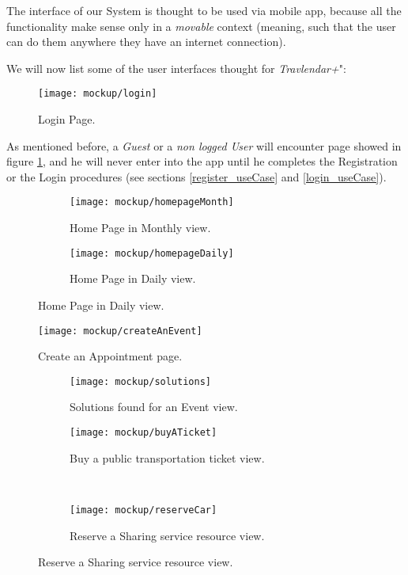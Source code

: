 The interface of our System is thought to be used via mobile app, because all the functionality make sense only in a \textit{movable} context (meaning, such that the user can do them anywhere they have an internet connection).

We will now list some of the user interfaces thought for \textit{Travlendar+}":

\begin{figure}[h]
	\texttt{[image: mockup/login]}
	\centering
	\caption{Login Page.}
	\label{fig:login}
\end{figure}
As mentioned before, a \textit{Guest} or a \textit{non logged User} will encounter page showed in figure \ref{fig:login}, and he will never enter into the app until he completes the Registration or the Login procedures (see sections \ref{register_useCase} and \ref{login_useCase}).

\begin{figure}[H]
	\begin{subfigure}{0.5\textwidth}
		\texttt{[image: mockup/homepageMonth]} 
		\centering
		\caption{Home Page in Monthly view.}
		\label{fig:homePage_Month}
	\end{subfigure}
	\begin{subfigure}{0.5\textwidth}
		\texttt{[image: mockup/homepageDaily]} 
		\centering
		\caption{Home Page in Daily view.}
		\label{fig:homePage_Day}
	\end{subfigure}
\end{figure}

\begin{figure}[h]
	\texttt{[image: mockup/createAnEvent]}
	\centering
	\caption{Create an Appointment page.}
	\label{fig:createEvent}
\end{figure}



\begin{figure}[H]
	\caption{Samples of the Travel logic module.}
	
	\begin{subfigure}{0.5\textwidth}
		\texttt{[image: mockup/solutions]} 
		\centering
		\caption{Solutions found for an Event view.}
		\label{fig:solutions}
	\end{subfigure}
	\begin{subfigure}{0.5\textwidth}
		\texttt{[image: mockup/buyATicket]} 
		\centering
		\caption{Buy a public transportation ticket view.}
		\label{fig:buyTicket}
	\end{subfigure} \\
	\begin{subfigure}{\linewidth}
		\texttt{[image: mockup/reserveCar]} 
		\centering
		\caption{Reserve a Sharing service resource view.}
		\label{fig:reserveCar}
	\end{subfigure}

	\label{fig:travelLogic}
\end{figure}

\vfill